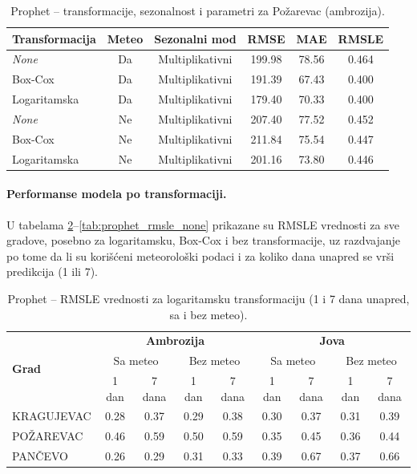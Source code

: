 \documentclass[12pt]{article}
\begin{document}
\begin{table}[h!]
    \label{tab:prophet_params}
\centering
\caption{Prophet – transformacije, sezonalnost i parametri za Požarevac (ambrozija).}

\renewcommand{\arraystretch}{1.3}
\begin{tabular}{|l|c|c|c|c|c|}
\hline
\textbf{Transformacija} & \textbf{Meteo} & \textbf{Sezonalni mod} & \textbf{RMSE} & \textbf{MAE} & \textbf{RMSLE} \\ \hline
\textit{None}   & Da  & Multiplikativni & 199.98 & 78.56 & 0.464 \\ \hline
Box-Cox & Da  & Multiplikativni & 191.39 & 67.43 & 0.400 \\ \hline
Logaritamska    & Da  & Multiplikativni & 179.40 & 70.33 & 0.400 \\ \hline
\textit{None}   & Ne  & Multiplikativni & 207.40 & 77.52 & 0.452 \\ \hline
Box-Cox & Ne  & Multiplikativni & 211.84 & 75.54 & 0.447 \\ \hline
Logaritamska    & Ne  & Multiplikativni & 201.16 & 73.80 & 0.446 \\ \hline
\end{tabular}
\end{table}

\paragraph{\textbf{Performanse modela po transformaciji.}  }
U tabelama \ref{tab:prophet_rmsle_log}–\ref{tab:prophet_rmsle_none} prikazane su RMSLE vrednosti za sve gradove, posebno za logaritamsku, Box-Cox i bez transformacije, uz razdvajanje po tome da li su korišćeni meteorološki podaci i za koliko dana unapred se vrši predikcija (1 ili 7).  

\begin{table}[h!]
\centering
\caption{Prophet – RMSLE vrednosti za logaritamsku transformaciju (1 i 7 dana unapred, sa i bez meteo).}
\label{tab:prophet_rmsle_log}
\begin{tabular}{|l|c|c|c|c||c|c|c|c|}
\hline
\multirow{3}{*}{\textbf{Grad}} 
& \multicolumn{4}{c||}{\textbf{Ambrozija}} 
& \multicolumn{4}{c|}{\textbf{Jova}} \\ \cline{2-9}
& \multicolumn{2}{c|}{Sa meteo} & \multicolumn{2}{c||}{Bez meteo} 
& \multicolumn{2}{c|}{Sa meteo} & \multicolumn{2}{c|}{Bez meteo} \\ \cline{2-9}
& 1 dan & 7 dana & 1 dan & 7 dana & 1 dan & 7 dana & 1 dan & 7 dana \\ \hline
KRAGUJEVAC & 0.28 & 0.37 & 0.29 & 0.38 & 0.30 & 0.37 & 0.31 & 0.39 \\ \hline
POŽAREVAC  & 0.46 & 0.59 & 0.50 & 0.59 & 0.35 & 0.45 & 0.36 & 0.44 \\ \hline
PANČEVO    & 0.26 & 0.29 & 0.31 & 0.33 & 0.39 & 0.67 & 0.37 & 0.66 \\ \hline
\end{tabular}
\end{table}
\end{document}
